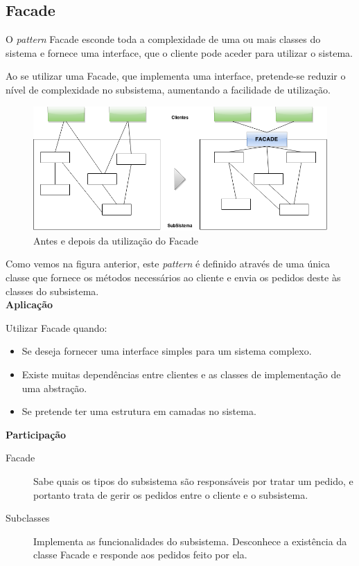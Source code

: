 \subsection{Facade}

O \textit{pattern} Facade esconde toda a complexidade de uma ou mais classes do sistema e fornece uma interface, que o cliente pode aceder  para utilizar o sistema.

Ao se utilizar uma Facade, que implementa uma interface, pretende-se reduzir o nível de complexidade no subsistema, aumentando a facilidade de utilização.\\

\begin{figure}[!h]
\centering
\includegraphics[scale=0.5]{img/facade-estrutura}
\caption{Antes e depois da utilização do Facade}
\end{figure}

Como vemos na figura anterior, este \textit{pattern} é definido através de uma única classe que fornece os métodos necessários ao cliente e envia os pedidos deste às classes do subsistema.\\

\textbf{Aplicação}

Utilizar Facade quando:

\begin{itemize}
  \item Se deseja fornecer uma interface simples para um sistema complexo.
  \item Existe muitas dependências entre clientes e as classes de implementação de uma abstração.
  \item Se pretende ter uma estrutura em camadas no sistema.\\
\end{itemize}

\textbf{Participação}

\begin{description}
  \item[Facade] Sabe quais os tipos do subsistema são responsáveis por tratar um pedido, e portanto trata de gerir os pedidos entre o cliente e o subsistema.
  \item[Subclasses] Implementa as funcionalidades do subsistema. Desconhece a existência da classe Facade e responde aos pedidos feito por ela.\\
\end{description}

